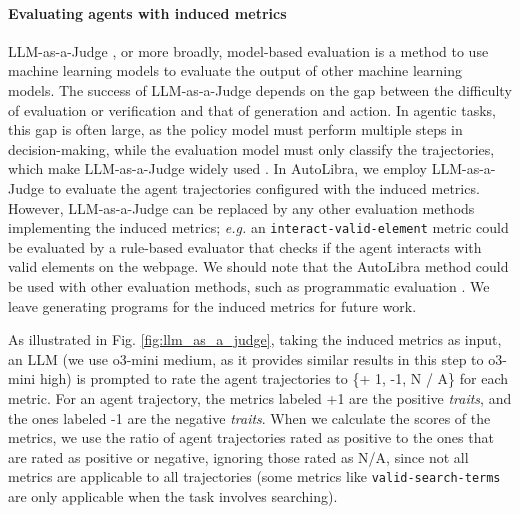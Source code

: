 \paragraph{Evaluating agents with induced metrics}
LLM-as-a-Judge \citep{zheng2023judging},
or more broadly, model-based evaluation
\citep{zhang2019bertscore,celikyilmaz2021evaluationtextgenerationsurvey}
is a method to use machine learning models to evaluate the output of other machine learning models.
The success of LLM-as-a-Judge depends on the gap between the difficulty of evaluation or verification and
that of generation and action. 
In agentic tasks, this gap is often large, as the policy model must perform multiple steps in decision-making, while the evaluation model must only
classify the trajectories, which make LLM-as-a-Judge widely used \citep{zhouwebarena,he2024webvoyager,zhousotopia}.
In AutoLibra, we employ LLM-as-a-Judge to
evaluate the agent trajectories configured with the induced metrics. However, LLM-as-a-Judge
can be replaced by any other evaluation methods implementing the induced metrics;
\emph{e.g.} an \texttt{interact-valid-element} metric
could be evaluated by a rule-based evaluator that checks if the agent
interacts with valid elements on the webpage. We should note that the AutoLibra method could be used with other evaluation methods, such as
programmatic evaluation \citep{maeureka}. We leave generating
programs for the induced metrics for future work.

As illustrated in Fig. \ref{fig:llm_as_a_judge}, taking the induced metrics as input, an LLM (we use o3-mini medium,
as it provides similar results in this step to o3-mini high) is prompted to rate the agent trajectories to \{+ 1, -1, N / A\} for each metric. For an agent trajectory, the metrics labeled +1 are
the positive \emph{traits}, and the ones labeled -1 are the negative \emph{traits}. When we calculate the scores of
the metrics, we use the ratio of agent trajectories rated as positive
to the ones that are rated as positive or negative, ignoring those rated as N/A,
since not all metrics are applicable to all trajectories
(some metrics like \texttt{valid-search-terms} are only applicable when the task
involves searching). 


